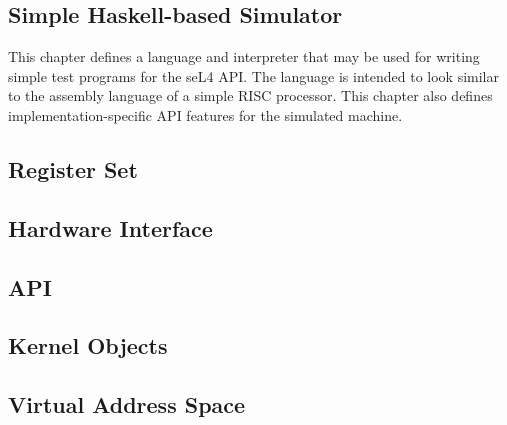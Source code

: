 \documentclass{ertos-book}
\begin{document}
\begin{impdetails}

\chapter{Simple Haskell-based Simulator}

This chapter defines a language and interpreter that may be used for writing simple test programs for the seL4 API. The language is intended to look similar to the assembly language of a simple RISC processor. This chapter also defines implementation-specific API features for the simulated machine.

\section{Register Set}


\section{Hardware Interface}


\section{API}


\section{Kernel Objects}


\section{Virtual Address Space}


\end{impdetails}


\end{document}

